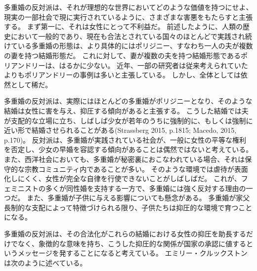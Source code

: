 \documentclass[paper=a4,book,openany]{jlreq}
\begin{document}
多重婚の反対派は、それが理想的な世界においてどのような価値を持つにせよ、現実の一部社会で現に実行されているように、さまざまな害悪をもたらすと主張する。
まず第一に、それは女性にとって不利益だ。
前述したように、人類の歴史において一般的であり、現在も合法とされている国々のほとんどで実践され続けている多重婚の形態は、より具体的にはポリジニー、すなわち一人の夫が複数の妻を持つ結婚形態だ。
これに対して、妻が複数の夫を持つ結婚形態であるポリアンドリーは、はるかに少ない。
近年、一部の研究者は従来考えられていたよりもポリアンドリーの事例は多いと主張している\citep{starkweather12:_survey_non_class_polyan}。
しかし、全体としては依然として稀だ。

多重婚の反対派は、実際にはほとんどの多重婚がポリジニーとなり、そのような結婚は女性に害を与え、抑圧する傾向があると主張する。
こうした結婚では夫が支配的な立場に立ち、しばしば少女が若年のうちに強制的に、もしくは強制に近い形で結婚させられることがある(Strassberg 2015, p.1815; Macedo, 2015, p.170)。
\nocite{strassberg15:_scrut_polyg}\nocite{macedo15:_just_married}
反対派は、多重婚が実践されている社会が、一般に女性の平等な権利を否定し、少女の早婚を容認する傾向があることは偶然ではないと考えている。
また、西洋社会においても、多重婚が秘密裏におこなわれている場合、それは保守的な宗教コミュニティ内であることが多い。
そのような環境では虐待が表面化しにくく、女性が完全な自律を行使できないことがしばしばだ。
これが、フェミニストの多くが同性婚を支持する一方で、多重婚には強く反対する理由の一つだ。
また、多重婚が子供に与える影響についても懸念がある。
多重婚が家父長制的な支配によって特徴づけられる限り、子供たちは抑圧的な環境で育つことになる。

多重婚の反対派は、その合法化がこれらの結婚における女性の抑圧を助長するだけでなく、象徴的な意味を持ち、こうした抑圧的な関係が国家の承認に値するというメッセージを発することになると考えている。
エミリー・クルックストンは次のように述べている。
\end{document}
